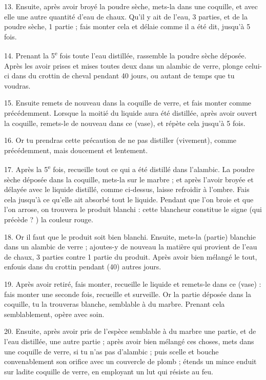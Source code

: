 \documentclass[a4paper, 11pt, oneside, polutonikogreek, french]{article}
\begin{document}
13. Ensuite, après avoir broyé la poudre sèche, mets-la dans une coquille, et avec elle une autre quantité d'eau de chaux. Qu'il y ait de l'eau, 3 parties, et de la poudre sèche, 1 partie ; fais monter cela et délaie comme il a été dit, jusqu'à 5 fois.

14. Prenant la 5\textsuperscript{e} fois toute l'eau distillée, rassemble la poudre sèche déposée. Après les avoir prises et mises toutes deux dans un alambic de verre, plonge celui-ci dans du crottin de cheval pendant 40 jours, ou autant de temps que tu voudras.

15. Ensuite remets de nouveau dans la coquille de verre, et fais monter comme précédemment. Lorsque la moitié du liquide aura été distillée, après avoir ouvert la coquille, remets-le de nouveau dans ce (vase), et répète cela jusqu'à 5 fois.

16. Or tu prendras cette précaution de ne pas distiller (vivement), comme précédemment, mais doucement et lentement.

17. Après la 5\textsuperscript{e} fois, recueille tout ce qui a été distillé dans l'alambic. La poudre sèche déposée dans la coquille, mets-la sur le marbre ; et après l'avoir broyée et délayée avec le liquide distillé, comme ci-dessus, laisse refroidir à l'ombre. Fais cela jusqu'à ce qu'elle ait absorbé tout le liquide. Pendant que l'on broie et que l'on arrose, on trouvera le produit blanchi : cette blancheur constitue le signe (qui précède ? ) la couleur rouge.

18. Or il faut que le produit soit bien blanchi. Ensuite, mets-la (partie) blanchie dans un alambic de verre ; ajoutes-y de nouveau la matière qui provient de l'eau de chaux, 3 parties contre 1 partie du produit. Après avoir bien mélangé le tout, enfouis dans du crottin pendant (40) autres jours.

19. Après avoir retiré, fais monter, recueille le liquide et remets-le dans ce (vase) : fais monter une seconde fois, recueille et surveille. Or la partie déposée dans la coquille, tu la trouveras blanche, semblable à du marbre. Prenant cela semblablement, opère avec soin.

20. Ensuite, après avoir pris de l'espèce semblable à du marbre une partie, et de l'eau distillée, une autre partie ; après avoir bien mélangé ces choses, mets dans une coquille de verre, si tu n'as pas d'alambic ; puis scelle et bouche convenablement son orifice avec un couvercle de plomb ; étends un mince enduit sur ladite coquille de verre, en employant un lut qui résiste au feu.
\end{document}
